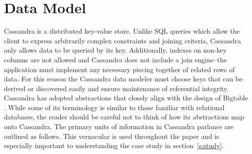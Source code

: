 \documentclass[twocolumn]{article}
\begin{document}
\section{Data Model}\label{s:datamodel}

Cassandra is a distributed key-value store. Unlike SQL queries which allow the client to express arbitrarily complex constraints and joining criteria, Cassandra only allows data to be queried by its key.  Additionally, indexes on non-key columns are not allowed and Cassandra does not include a join engine--the application must implement any necessary piecing together of related rows of data.  For this reason the Cassandra data modeler must choose keys that can be derived or discovered easily and ensure maintenance of referential integrity. Cassandra has adopted abstractions that closely align with the design of Bigtable \cite{ref:bigtable,ref:cwiki}.  While some of its terminology is similar to those familiar with relational databases, the reader should be careful not to think of how its abstractions map onto Cassandra.  The primary units of information in Cassandra parlance are outlined as follows.  This vernacular is used throughout the paper and is especially important to understanding the case study in section~\ref{s:study}.
\end{document}
